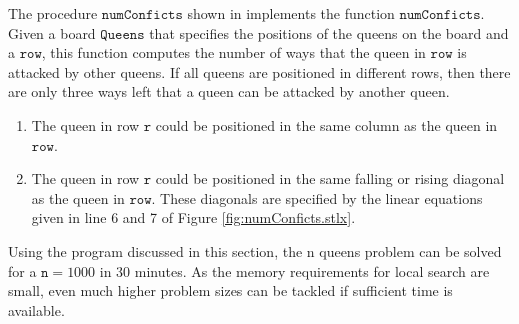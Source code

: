 The procedure $\mathtt{numConficts}$ shown in  implements the function
$\mathtt{numConficts}$.  Given a board $\mathtt{Queens}$ that specifies the positions of the queens on the
board and a $\mathtt{row}$, this function computes the number of ways that the queen in $\mathtt{row}$ is
attacked by other queens.  If all queens are positioned in different rows, then there are only three ways left
that a queen can be attacked by another queen.
\begin{enumerate}
\item The queen in row $\mathtt{r}$ could be positioned in the same column as the queen in $\mathtt{row}$.
\item The queen in row $\mathtt{r}$ could be positioned in the same falling or rising diagonal as the queen in
      $\mathtt{row}$.  These diagonals are specified by the linear equations given in line 6 and 7 of Figure
      \ref{fig:numConficts.stlx}.
\end{enumerate}
Using the program discussed in this section, the n queens problem can be solved for a $\mathtt{n} = 1000$ in
30 minutes.  As the memory requirements for local search are small, even much higher problem sizes can be
tackled if sufficient time is available.

